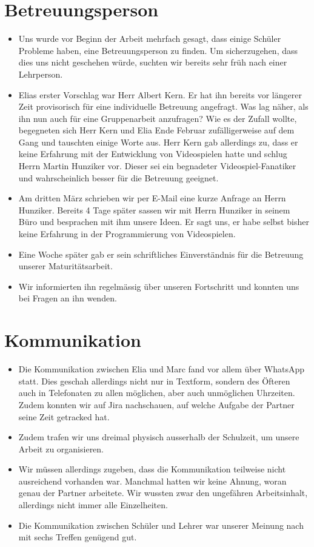 \section{Betreuungsperson}
\begin{itemize}
    \item Uns wurde vor Beginn der Arbeit mehrfach gesagt, dass einige Schüler Probleme haben, eine Betreuungsperson zu finden. Um sicherzugehen, dass dies uns nicht geschehen würde, suchten wir bereits sehr früh nach einer Lehrperson.
    \item Elias erster Vorschlag war Herr Albert Kern. Er hat ihn bereits vor längerer Zeit provisorisch für eine individuelle Betreuung angefragt. Was lag näher, als ihn nun auch für eine Gruppenarbeit anzufragen? Wie es der Zufall wollte, begegneten sich 
    Herr Kern und Elia Ende Februar zufälligerweise auf dem Gang und tauschten einige Worte aus. Herr Kern gab allerdings zu, dass er keine Erfahrung mit der Entwicklung von Videospielen hatte und schlug Herrn Martin Hunziker vor.
    Dieser sei ein begnadeter Videospiel-Fanatiker und wahrscheinlich besser für die Betreuung geeignet. 
    \item Am dritten März schrieben wir per E-Mail eine kurze Anfrage an Herrn Hunziker. 
    Bereits 4 Tage später sassen wir mit Herrn Hunziker in seinem Büro und besprachen mit ihm unsere Ideen. Er sagt uns, er habe selbst bisher keine Erfahrung in der Programmierung von Videospielen.
    \item Eine Woche später gab er sein schriftliches Einverständnis für die Betreuung unserer Maturitätsarbeit. 
    \item Wir informierten ihn regelmässig über unseren Fortschritt und konnten uns bei Fragen an ihn wenden.
\end{itemize}

\section{Kommunikation}
\begin{itemize}
    \item Die Kommunikation zwischen Elia und Marc fand vor allem über WhatsApp statt. Dies geschah allerdings nicht nur in Textform, sondern des Öfteren auch in Telefonaten zu allen möglichen, aber auch unmöglichen Uhrzeiten. Zudem konnten wir auf Jira nachschauen, auf welche Aufgabe der Partner
    seine Zeit getracked hat. 
    \item Zudem trafen wir uns dreimal physisch ausserhalb der Schulzeit, um unsere Arbeit zu organisieren.
    \item Wir müssen allerdings zugeben, dass die Kommunikation teilweise nicht ausreichend vorhanden war. Manchmal hatten wir keine Ahnung, woran genau der Partner arbeitete. Wir wussten zwar den ungefähren Arbeitsinhalt, allerdings nicht immer alle Einzelheiten.
    \item Die Kommunikation zwischen Schüler und Lehrer war unserer Meinung nach mit sechs Treffen genügend gut.
\end{itemize}



